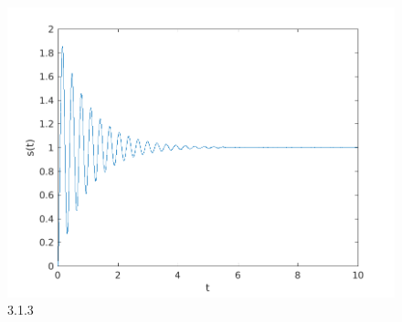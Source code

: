 \documentclass{article}
\begin{document}
\begin{figure}
\centering
\includegraphics[width=1\linewidth]{p1.png}
\caption{3.1.3}
\end{figure}
\end{document}
